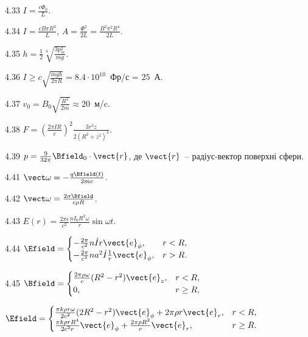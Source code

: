 \begin{Solution}{4.{33}}
	$I = \frac{c\Phi_0}{L}$.
\end{Solution}
\begin{Solution}{4.{34}}
	$I = \frac{cB\pi R^2}{L}$, $A = \frac{\Phi^2}{2L} = \frac{B^2\pi^2 R^4}{2L}$.
\end{Solution}
\begin{Solution}{4.{35}}
	$h = \frac12 \sqrt[4]{\frac{3p_m^2}{mg}}$.
\end{Solution}
\begin{Solution}{4.{36}}
	$I \ge c \sqrt{\frac{mgh}{2\pi R}} = 8.4\cdot 10^{10}$~Фр/с = $25$~А.
\end{Solution}
\begin{Solution}{4.{37}}
	$v_0 = B_0 \sqrt{\frac{R^3}{2m}} \approx 20$~м/c.
\end{Solution}
\begin{Solution}{4.{38}}
	$F = \left( \frac{2\pi I R}{c} \right)^2 \frac{3r^3 z}{2(R^2 + z^2)^4} $.
\end{Solution}
\begin{Solution}{4.{39}}
	$ p = \frac{9}{32\pi} \Bfield_0\cdot\vect{r}$, де $\vect{r}$~-- радіус-вектор поверхні сфери.
\end{Solution}
\begin{Solution}{4.{41}}
	$\vect\omega = -\frac{q\Bfield(t)}{2mc}$.
\end{Solution}
\begin{Solution}{4.{42}}
	$\vect\omega = \frac{2\sigma\Bfield}{c\rho R}$.
\end{Solution}
\begin{Solution}{4.{43}}
	$E(r) = \frac{2\pi\epsilon}{c^2}\frac{nI_0R^2\omega}{r}\sin\omega t$.
\end{Solution}
\begin{Solution}{4.{44}}
	$
		\Efield =
		\begin{cases}
			- \frac{2\pi}{c^2} n\dot{I} r\vect{e}_{\phi},               & r < R, \\
			- \frac{2\pi}{c^2} n a^2\dot{I} \frac{1}{r}\vect{e}_{\phi}, & r > R.
		\end{cases}
	$
\end{Solution}
\begin{Solution}{4.{45}}
	$
		\Bfield =
		\begin{cases}
			\frac{2\pi\rho\omega}{c}(R^2 - r^2)\vect{e}_z, & r< R,    \\
			0,                                             & r \ge R,
		\end{cases}
	$

	$
		\Efield =
		\begin{cases}
			\frac{\pi k \rho r\omega}{2c^2}(2R^2 - r^2)\vect{e}_{\phi} + 2\pi\rho r \vect{e}_r, & r< R,    \\
			\frac{\pi k \rho r R^4}{2c^2r}\vect{e}_{\phi} + \frac{2\pi \rho R^2}{r}\vect{e}_r,  & r \ge R.
		\end{cases}
	$
\end{Solution}
